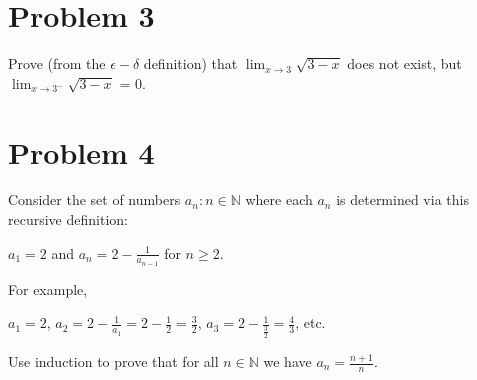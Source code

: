 \documentclass{article}
\begin{document}
\begin{flushleft}
\newpage

\section*{Problem 3}
Prove (from the $\epsilon-\delta$ definition) that $\displaystyle \lim_{x \to 3} \sqrt{3-x}$ does not exist, but $\displaystyle \lim_{x \to 3^-} \sqrt{3-x}$ = 0.

\newpage

\section*{Problem 4}
Consider the set of numbers ${a_n: n \in \mathbb{N}}$ where each $a_n$ is determined via this recursive definition:\\

\begin{center}
$a_1=2$ and $a_n=2-\frac{1}{a_{n-1}}$ for $n \geq 2$.\\  
\end{center}
For example,
\begin{center}
$a_1=2$, $a_2=2-\frac{1}{a_1}=2-\frac{1}{2}=\frac{3}{2}$, $a_3=2-\frac{1}{\frac{3}{2}}=\frac{4}{3}$, etc. \\  
\end{center}
Use induction to prove that for all $n \in \mathbb{N}$ we have $a_n = \frac{n+1}{n}$.
\end{flushleft}

\end{document}
